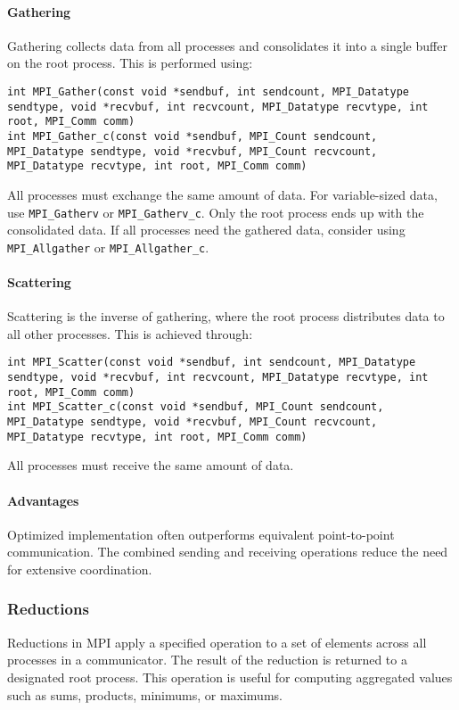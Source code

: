\paragraph*{Gathering}
Gathering collects data from all processes and consolidates it into a single buffer on the root process.
This is performed using:
\begin{lstlisting}[style=C]
int MPI_Gather(const void *sendbuf, int sendcount, MPI_Datatype sendtype, void *recvbuf, int recvcount, MPI_Datatype recvtype, int root, MPI_Comm comm)
int MPI_Gather_c(const void *sendbuf, MPI_Count sendcount, MPI_Datatype sendtype, void *recvbuf, MPI_Count recvcount, MPI_Datatype recvtype, int root, MPI_Comm comm)
\end{lstlisting}
All processes must exchange the same amount of data. For variable-sized data, use \texttt{MPI\_Gatherv} or \texttt{MPI\_Gatherv\_c}.
Only the root process ends up with the consolidated data. If all processes need the gathered data, consider using \texttt{MPI\_Allgather} or \texttt{MPI\_Allgather\_c}.

\paragraph*{Scattering}
Scattering is the inverse of gathering, where the root process distributes data to all other processes. 
This is achieved through:
\begin{lstlisting}[style=C]
int MPI_Scatter(const void *sendbuf, int sendcount, MPI_Datatype sendtype, void *recvbuf, int recvcount, MPI_Datatype recvtype, int root, MPI_Comm comm)
int MPI_Scatter_c(const void *sendbuf, MPI_Count sendcount, MPI_Datatype sendtype, void *recvbuf, MPI_Count recvcount, MPI_Datatype recvtype, int root, MPI_Comm comm)
\end{lstlisting}
All processes must receive the same amount of data. 

\paragraph*{Advantages}
Optimized implementation often outperforms equivalent point-to-point communication.
The combined sending and receiving operations reduce the need for extensive coordination.

\subsubsection{Reductions}
Reductions in MPI apply a specified operation to a set of elements across all processes in a communicator. 
The result of the reduction is returned to a designated root process. 
This operation is useful for computing aggregated values such as sums, products, minimums, or maximums.

